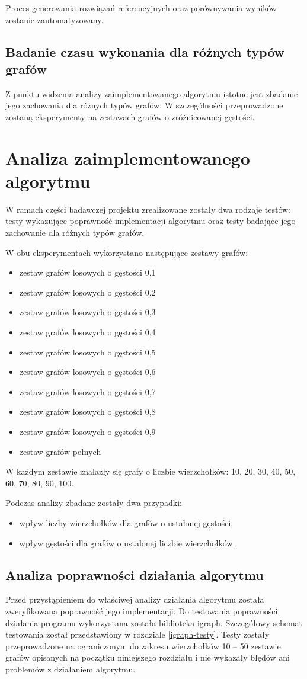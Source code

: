 \documentclass[12pt, a4paper]{article}
\begin{document}
Proces generowania rozwiązań referencyjnych oraz porównywania wyników zostanie zautomatyzowany.
\subsection{Badanie czasu wykonania dla różnych typów grafów}
Z punktu widzenia analizy zaimplementowanego algorytmu istotne jest zbadanie jego zachowania dla różnych typów grafów. W szczególności przeprowadzone zostaną eksperymenty na zestawach grafów o zróżnicowanej gęstości.

\section{Analiza zaimplementowanego algorytmu}
W ramach części badawczej projektu zrealizowane zostały dwa rodzaje testów: testy wykazujące poprawność implementacji algorytmu oraz testy badające jego zachowanie dla różnych typów grafów.

W obu eksperymentach wykorzystano następujące zestawy grafów:
\begin{itemize}
	\item zestaw grafów losowych o gęstości 0,1
	\item zestaw grafów losowych o gęstości 0,2
	\item zestaw grafów losowych o gęstości 0,3
    \item zestaw grafów losowych o gęstości 0,4
	\item zestaw grafów losowych o gęstości 0,5
	\item zestaw grafów losowych o gęstości 0,6
	\item zestaw grafów losowych o gęstości 0,7
	\item zestaw grafów losowych o gęstości 0,8
	\item zestaw grafów losowych o gęstości 0,9
	\item zestaw grafów pełnych
\end{itemize}
W każdym zestawie znalazły się grafy o liczbie wierzchołków: 10, 20, 30, 40, 50, 60, 70, 80, 90, 100.

Podczas analizy zbadane zostały dwa przypadki:
\begin{itemize}
	\item wpływ liczby wierzchołków dla grafów o ustalonej gęstości,
	\item wpływ gęstości dla grafów o ustalonej liczbie wierzchołków.
\end{itemize}

\subsection{Analiza poprawności działania algorytmu}
Przed przystąpieniem do właściwej analizy działania algorytmu została zweryfikowana poprawność jego implementacji. Do testowania poprawności działania programu wykorzystana została biblioteka igraph. Szczegółowy schemat testowania został przedstawiony w rozdziale \ref{igraph-testy}.
Testy zostały przeprowadzone na ograniczonym do zakresu wierzchołków 10 -- 50 zestawie grafów opisanych na początku niniejszego rozdziału i nie wykazały błędów ani problemów z działaniem algorytmu.
\end{document}
